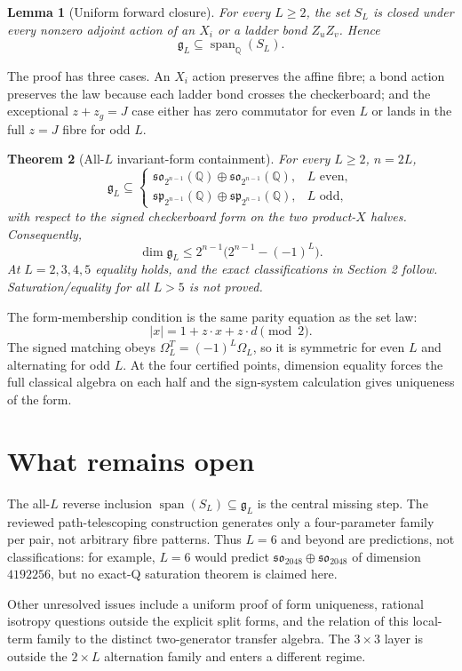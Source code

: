 \documentclass[11pt]{article}
\newtheorem{theorem}{Theorem}[section]
\newtheorem{lemma}[theorem]{Lemma}
\newcommand{\Q}{\mathbb Q}
\newcommand{\g}{\mathfrak g}
\newcommand{\so}{\mathfrak{so}}
\renewcommand{\sp}{\mathfrak{sp}}
\begin{document}
\begin{lemma}[Uniform forward closure]
For every $L\ge2$, the set $S_L$ is closed under every nonzero adjoint action of an $X_i$ or a ladder bond $Z_uZ_v$.  Hence
\[
 \g_L\subseteq\operatorname{span}_{\Q}(S_L).
\]
\end{lemma}

The proof has three cases.  An $X_i$ action preserves the affine fibre; a bond action preserves the law because each ladder bond crosses the checkerboard; and the exceptional $z+z_g=J$ case either has zero commutator for even $L$ or lands in the full $z=J$ fibre for odd $L$.

\begin{theorem}[All-$L$ invariant-form containment]
For every $L\ge2$, $n=2L$,
\[
 \g_L\subseteq
 \begin{cases}
 \so_{2^{n-1}}(\Q)\oplus\so_{2^{n-1}}(\Q),&L\text{ even},\\
 \sp_{2^{n-1}}(\Q)\oplus\sp_{2^{n-1}}(\Q),&L\text{ odd},
 \end{cases}
\]
with respect to the signed checkerboard form on the two product-$X$ halves. Consequently,
\[
 \dim\g_L\le 2^{n-1}\bigl(2^{n-1}-(-1)^L\bigr).
\]
At $L=2,3,4,5$ equality holds, and the exact classifications in Section 2 follow.  Saturation/equality for all $L>5$ is not proved.
\end{theorem}

The form-membership condition is the same parity equation as the set law:
\[
 |x|=1+z\cdot x+z\cdot d\pmod2.
\]
The signed matching obeys $\Omega_L^T=(-1)^L\Omega_L$, so it is symmetric for even $L$ and alternating for odd $L$. At the four certified points, dimension equality forces the full classical algebra on each half and the sign-system calculation gives uniqueness of the form.

\section{What remains open}
The all-$L$ reverse inclusion $\operatorname{span}(S_L)\subseteq\g_L$ is the central missing step.  The reviewed path-telescoping construction generates only a four-parameter family per pair, not arbitrary fibre patterns.  Thus $L=6$ and beyond are predictions, not classifications: for example, $L=6$ would predict $\so_{2048}\oplus\so_{2048}$ of dimension $4192256$, but no exact-Q saturation theorem is claimed here.

Other unresolved issues include a uniform proof of form uniqueness, rational isotropy questions outside the explicit split forms, and the relation of this local-term family to the distinct two-generator transfer algebra.  The $3\times3$ layer is outside the $2\times L$ alternation family and enters a different regime.
\end{document}
